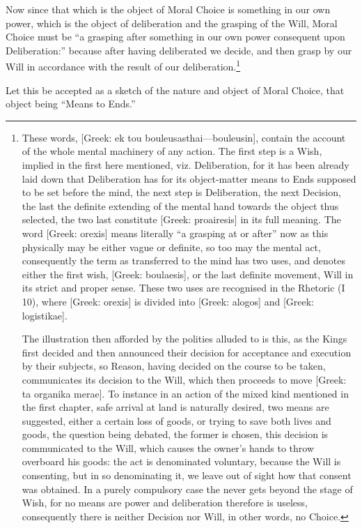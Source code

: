Now since that which is the object of Moral Choice is something in our own
power, which is the object of deliberation and the grasping of the Will, Moral
Choice must be “a grasping after something in our own power consequent
upon Deliberation:” because after having deliberated we decide, and then
grasp by our Will in accordance with the result of our deliberation.\footnote{These words, [Greek: ek tou bouleusasthai—bouleusin], contain the account
of the whole mental machinery of any action. The first step is a Wish, implied
in the first here mentioned, viz. Deliberation, for it has been already laid
down that Deliberation has for its object-matter means to Ends supposed to be
set before the mind, the next step is Deliberation, the next Decision, the last
the definite extending of the mental hand towards the object thus selected, the
two last constitute [Greek: proairesis] in its full meaning. The word [Greek:
orexis] means literally “a grasping at or after” now as this
physically may be either vague or definite, so too may the mental act,
consequently the term as transferred to the mind has two uses, and denotes
either the first wish, [Greek: boulaesis], or the last definite movement, Will
in its strict and proper sense. These two uses are recognised in the Rhetoric
(I 10), where [Greek: orexis] is divided into [Greek: alogos] and [Greek:
logistikae].

The illustration then afforded by the polities alluded to is this, as the
Kings first decided and then announced their decision for acceptance and
execution by their subjects, so Reason, having decided on the course to be
taken, communicates its decision to the Will, which then proceeds to move
[Greek: ta organika merae]. To instance in an action of the mixed kind
mentioned in the first chapter, safe arrival at land is naturally desired, two
means are suggested, either a certain loss of goods, or trying to save both
lives and goods, the question being debated, the former is chosen, this
decision is communicated to the Will, which causes the owner’s hands to
throw overboard his goods: the act is denominated voluntary, because the Will
is consenting, but in so denominating it, we leave out of sight how that
consent was obtained. In a purely compulsory case the never gets beyond the
stage of Wish, for no means are power and deliberation therefore is useless,
consequently there is neither Decision nor Will, in other words, no Choice.}

Let this be accepted as a sketch of the nature and object of Moral Choice, that
object being “Means to Ends.”

